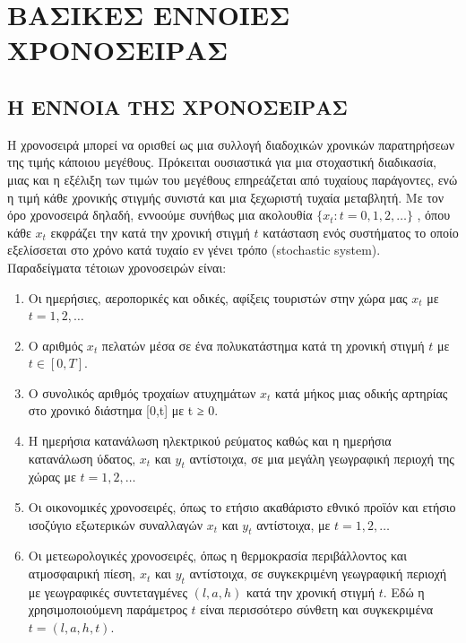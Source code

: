 
\chapter{ΒΑΣΙΚΕΣ ΕΝΝΟΙΕΣ ΧΡΟΝΟΣΕΙΡΑΣ}



\section{Η ΕΝΝΟΙΑ ΤΗΣ ΧΡΟΝΟΣΕΙΡΑΣ}
 Η χρονοσειρά μπορεί να ορισθεί ως μια συλλογή διαδοχικών χρονικών
παρατηρήσεων της τιμής κάποιου μεγέθους. Πρόκειται ουσιαστικά για μια στοχαστική
διαδικασία, μιας και η εξέλιξη των τιμών του μεγέθους επηρεάζεται από τυχαίους
παράγοντες, ενώ η τιμή κάθε χρονικής στιγμής συνιστά και μια ξεχωριστή τυχαία
μεταβλητή. Με τον όρο χρονοσειρά δηλαδή, εννοούμε συνήθως μια ακολουθία $\{ x_t : t = 0,1,2,\ldots \}$ , όπου
κάθε $ x_t $ εκφράζει την κατά την χρονική στιγμή $ t $ κατάσταση ενός συστήματος το
οποίο εξελίσσεται στο χρόνο κατά τυχαίο εν γένει τρόπο (stochastic system).\\ 
Παραδείγματα τέτοιων χρονοσειρών είναι: \\
\begin{enumerate}


\item Οι ημερήσιες, αεροπορικές και οδικές, αφίξεις τουριστών στην χώρα μας $ x_t $ με
$t = 1, 2,\ldots $
\item Ο αριθμός $ x_t $ πελατών μέσα σε ένα πολυκατάστημα κατά τη χρονική στιγμή
$ t $ με $ t \in [0, T ] $.
\item Ο συνολικός αριθμός τροχαίων ατυχημάτων $ x_t $ κατά μήκος μιας οδικής
αρτηρίας στο χρονικό διάστημα [0,t] με t ≥ 0.
\item Η ημερήσια κατανάλωση ηλεκτρικού ρεύματος καθώς και η ημερήσια
κατανάλωση ύδατος, $ x_t $ και $ y_t $ αντίστοιχα, σε μια μεγάλη γεωγραφική περιοχή
της χώρας με $ t = 1, 2,\ldots $

\item Οι οικονομικές χρονοσειρές, όπως το ετήσιο ακαθάριστο εθνικό προϊόν και
ετήσιο ισοζύγιο εξωτερικών συναλλαγών $ x_t $ και $ y_t $ αντίστοιχα, με $ t = 1, 2,\ldots $
\item Οι μετεωρολογικές χρονοσειρές, όπως η θερμοκρασία περιβάλλοντος και
ατμοσφαιρική πίεση, $ x_t $ και $ y_t $ αντίστοιχα, σε συγκεκριμένη γεωγραφική
περιοχή με γεωγραφικές συντεταγμένες $ \left(l, a, h \right) $ κατά την χρονική στιγμή $ t $.
Εδώ η χρησιμοποιούμενη παράμετρος $ t $ είναι περισσότερο σύνθετη και
συγκεκριμένα $ t = \left( l,a,h ,t \right) $.
\end{enumerate}

